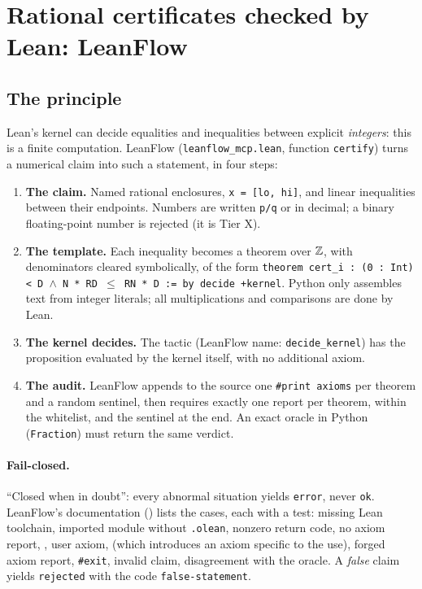 \section{Rational certificates checked by Lean: LeanFlow}\label{appD:sec:leanflow}

\subsection{The principle}
Lean's kernel can decide equalities and inequalities between explicit \emph{integers}: this is a finite computation.
LeanFlow (\texttt{leanflow\_mcp.lean}, function \texttt{certify}) turns a numerical claim into such a statement, in four
steps:
\begin{enumerate}
\item \textbf{The claim.} Named rational enclosures, \texttt{x = [lo, hi]}, and linear inequalities between their
endpoints. Numbers are written \texttt{p/q} or in decimal; a binary floating-point number is rejected (it is Tier X).
\item \textbf{The template.} Each inequality becomes a theorem over $\mathbb{Z}$, with denominators cleared symbolically, of the
form \texttt{theorem cert\_i : (0 : Int) < D $\wedge$ N * RD $\le$ RN * D := by decide +kernel}. Python only assembles
text from integer literals; all multiplications and comparisons are done by Lean.
\item \textbf{The kernel decides.} The tactic  (LeanFlow name: \texttt{decide\_kernel}) has the
proposition evaluated by the kernel itself, with no additional axiom.
\item \textbf{The audit.} LeanFlow appends to the source one \texttt{\#print axioms} per theorem and a random sentinel,
then requires exactly one report per theorem, within the whitelist, and the sentinel at the end. An exact oracle in
Python (\texttt{Fraction}) must return the same verdict.
\end{enumerate}

\paragraph{Fail-closed.} ``Closed when in doubt'': every abnormal situation yields \texttt{error}, never \texttt{ok}.
LeanFlow's documentation () lists the cases, each with a test: missing Lean toolchain,
imported module without \texttt{.olean}, nonzero return code, no axiom report, , user axiom,
 (which introduces an axiom specific to the use), forged axiom report, \texttt{\#exit}, invalid
claim, disagreement with the oracle. A \emph{false} claim yields \texttt{rejected} with the code
\texttt{false-statement}.


